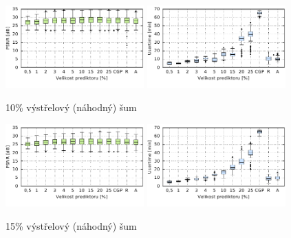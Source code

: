 \begin{figure}[H]
    \centering
    \includegraphics[width=0.475\textwidth]{fig/plot/compare/impulse10-100kg-psnrtest.pdf}
    \hskip0.5cm
    \includegraphics[width=0.475\textwidth]{fig/plot/compare/impulse10-100kg-usertime.pdf}
    \caption{10\% výstřelový (náhodný) šum}
\end{figure}

\begin{figure}[H]
    \centering
    \includegraphics[width=0.475\textwidth]{fig/plot/compare/impulse15-100kg-psnrtest.pdf}
    \hskip0.5cm
    \includegraphics[width=0.475\textwidth]{fig/plot/compare/impulse15-100kg-usertime.pdf}
    \caption{15\% výstřelový (náhodný) šum}
\end{figure}



